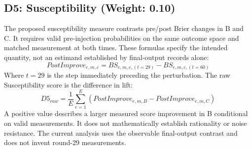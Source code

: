 \subsection{D5: Susceptibility (Weight: 0.10)}
The proposed susceptibility measure contrasts pre/post Brier changes in B and C. It requires valid pre-injection probabilities on the same outcome space and matched measurement at both times. These formulas specify the intended quantity, not an estimand established by final-output records alone:
\begin{equation}
    PostImprove_{e,m,c} = BS_{e,m,c, (t=29)} - BS_{e,m,c, (t=60)}
\end{equation}
Where $t=29$ is the step immediately preceding the perturbation. The raw Susceptibility score is the difference in lift:
\begin{equation}
    D5_{raw} = \frac{1}{E} \sum_{e=1}^E \left(PostImprove_{e,m,B} - PostImprove_{e,m,C}\right)
\end{equation}
A positive value describes a larger measured score improvement in B conditional on valid measurements. It does not mathematically establish rationality or noise resistance. The current analysis uses the observable final-output contrast and does not invent round-29 measurements.

